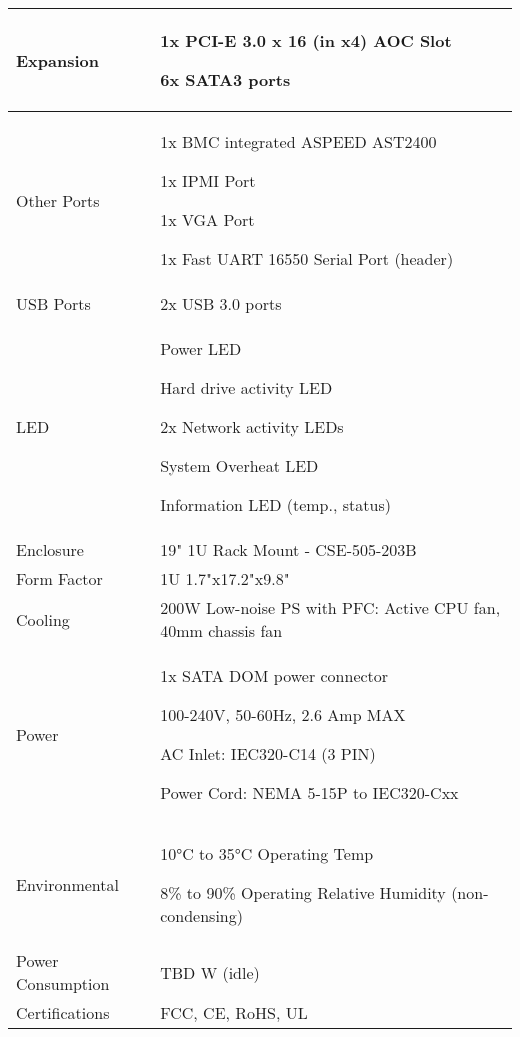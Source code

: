 \newpage

\begin{table}
    \begin{center}
    \begin{tabular}{ | m{5cm} | m{12cm} | }
    \hline Expansion &
    \begin{description} 
        \item 1x PCI-E 3.0 x 16 (in x4) AOC Slot
        \item 6x SATA3 ports \end{description} \\ \hline
    Other Ports &
    \begin{description} 
        \item 1x BMC integrated ASPEED AST2400
        \item 1x IPMI Port 
        \item 1x VGA Port
        \item 1x Fast UART 16550 Serial Port (header) \end{description} \\ \hline
    USB Ports & 2x USB 3.0 ports \\ \hline
    LED &
    \begin{description}
        \item Power LED
        \item Hard drive activity LED
        \item 2x Network activity LEDs
        \item System Overheat LED
        \item Information LED (temp., status) \end{description} \\ \hline
    Enclosure & 19" 1U Rack Mount - CSE-505-203B \\ \hline
    Form Factor & 1U 1.7"x17.2"x9.8" \\ \hline
    Cooling & 200W Low-noise PS with PFC: Active CPU fan, 40mm chassis fan \\ \hline
    Power & 
    \begin{description}
        \item 1x SATA DOM power connector
        \item 100-240V, 50-60Hz, 2.6 Amp MAX
        \item AC Inlet: IEC320-C14 (3 PIN)
        \item Power Cord: NEMA 5-15P to IEC320-Cxx \end{description} \\ \hline   
    Environmental & 
    \begin{description}
        \item 10°C to 35°C Operating Temp
        \item 8\% to 90\% Operating Relative Humidity (non-condensing) \end{description} \\ \hline
    Power Consumption & TBD W (idle) \\ \hline
    Certifications & FCC, CE, RoHS, UL \\ \hline
    \end{tabular}
    \end{center}
\end{table} 





